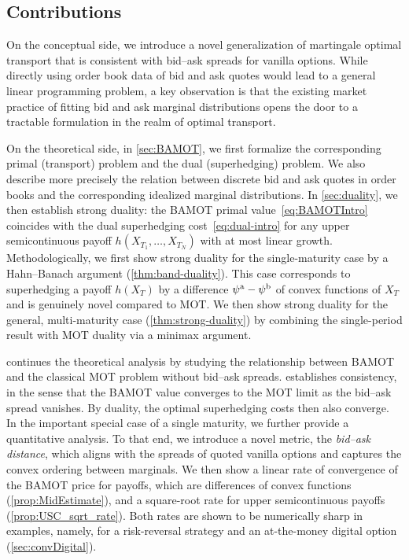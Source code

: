 \documentclass[11pt]{article}
\theoremstyle{plain}
\theoremstyle{definition}
\theoremstyle{remark}
\theoremstyle{plain}
\begin{document}
\subsection{Contributions}

On the conceptual side, we introduce 
%
a novel generalization of martingale optimal transport that is consistent with bid--ask spreads for vanilla options. While directly using order book data of bid and ask quotes would lead to a general linear programming problem, a key observation is that the existing market practice of fitting bid and ask marginal distributions opens the door to a tractable formulation in the realm of optimal transport.

On the theoretical side, in \cref{sec:BAMOT}, we first formalize the corresponding primal (transport) problem and the dual (superhedging) problem. We also describe more precisely the relation between discrete bid and ask quotes in order books and the corresponding idealized marginal distributions. In \cref{sec:duality}, we then establish strong duality: the BAMOT primal value~\eqref{eq:BAMOTIntro} coincides with the dual superhedging cost~\eqref{eq:dual-intro} for any upper semicontinuous payoff $h(X_{T_1},\dots,X_{T_N})$ with at most linear growth. Methodologically, we first show strong duality for the single-maturity case by a Hahn--Banach argument (\cref{thm:band-duality}). This case corresponds to superhedging a payoff $h(X_T)$ by a difference $\psi^{\rm a} - \psi^{\rm b}$ of convex functions of $X_T$ and is genuinely novel compared to MOT. We then show strong duality for the general, multi-maturity case (\cref{thm:strong-duality}) by combining the single-period result with MOT duality via a minimax argument.

 continues the theoretical analysis by studying the relationship between BAMOT and the classical MOT problem without bid--ask spreads.  establishes consistency, in the sense that the BAMOT value converges to the MOT limit as the bid--ask spread vanishes. By duality, the optimal superhedging costs then also converge. In the important special case of a single maturity, we further provide a quantitative analysis. To that end, we introduce a novel metric, the \emph{bid--ask distance}, which aligns with the spreads of quoted vanilla options and captures the convex ordering between marginals. We then show a linear rate of convergence of the BAMOT price for payoffs, which are differences of convex functions (\cref{prop:MidEstimate}), and a square-root rate for upper semicontinuous payoffs (\cref{prop:USC_sqrt_rate}). Both rates are shown to be numerically sharp in examples, namely, for a risk-reversal strategy and an at-the-money digital option (\cref{sec:convDigital}).
%
\end{document}
